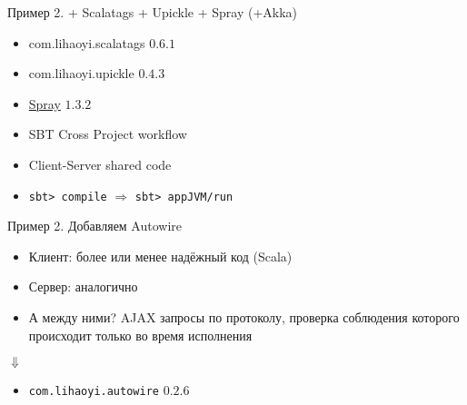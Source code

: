 \begin{frame}{Пример 2. + Scalatags + Upickle + Spray (+Akka)}
\begin{itemize}
	\item com.lihaoyi.scalatags $0.6.1$
	\item com.lihaoyi.upickle $0.4.3$
	\item \href{http://spray.io/}{Spray} $1.3.2$
\end{itemize}
\begin{itemize}
	\item SBT Cross Project workflow
	\item Client-Server shared code
	\item \texttt{sbt> compile} $\Rightarrow$ \texttt{sbt> appJVM/run}
\end{itemize}
\end{frame}

\begin{frame}{Пример 2. Добавляем Autowire}
\begin{itemize}
	\item \alert{Клиент}: более или менее надёжный код (Scala)
	\item \alert{Сервер}: аналогично
	\item \alert{А между ними?} AJAX запросы по протоколу, проверка соблюдения которого происходит только во время исполнения
\end{itemize}
\begin{center}
$\Downarrow$
\end{center}
\begin{itemize}
	\item \texttt{com.lihaoyi.autowire} $0.2.6$
\end{itemize}
\end{frame}


